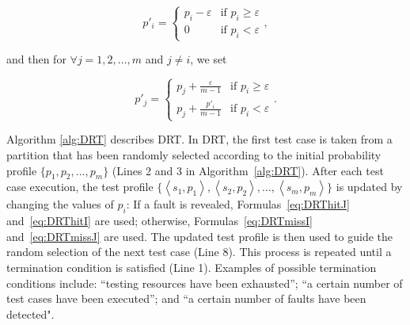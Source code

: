 \documentclass[10pt,journal,compsoc]{IEEEtran}
\begin{document}
\begin{equation}
\label{eq:DRTmissI}
p'_i =
\begin{cases}
p_i - \varepsilon & \text{if } p_i \geq \varepsilon \\
0 & \text{if } p_i < \varepsilon
\end{cases},
\end{equation}

and then for $\forall j = 1, 2, \ldots, m$ and $j \neq i$, we set

\begin{equation}
\label{eq:DRTmissJ}
p'_j =
\begin{cases}
p_j + \displaystyle\frac{\varepsilon}{m-1} & \text{if } p_i \geq \varepsilon \\
p_j + \displaystyle\frac{p'_i}{m-1} & \text{if } p_i < \varepsilon
\end{cases}.
\end{equation}

Algorithm \ref{alg:DRT} describes DRT.
In DRT, the first test case is taken from a partition that has been randomly selected according to the initial probability profile $\{p_1, p_2, \ldots, p_m\}$ (Lines 2 and 3 in Algorithm~\ref{alg:DRT}).
After each test case execution, the test profile $\{ \left \langle s_1,p_1 \right \rangle, \left \langle s_2,p_2 \right \rangle, \ldots, \left \langle s_m,p_m \right \rangle\}$ is updated by changing the values of $p_i$:
If a fault is revealed, Formulas~\ref{eq:DRThitJ} and~\ref{eq:DRThitI} are used;
otherwise, Formulas~\ref{eq:DRTmissI} and~\ref{eq:DRTmissJ} are used.
The updated test profile is then used to guide the random selection of the next test case (Line 8).
This process is repeated until a termination condition is satisfied (Line 1).
Examples of possible termination conditions include:
 ``testing resources have been exhausted'';
 ``a certain number of test cases have been executed''; and
 ``a certain number of faults have been detected".
\end{document}
